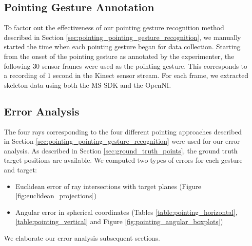 \subsection{Pointing Gesture Annotation}
\label{sec:pointing_gesture_annotation}

To factor out the effectiveness of our pointing gesture recognition method described in Section \ref{sec:pointing_pointing_gesture_recognition}, we manually started the time when each pointing gesture began for data collection. Starting from the onset of the pointing gesture as annotated by the experimenter, the following $30$ sensor frames were used as the pointing gesture. This corresponds to a recording of $1$ second in the Kinect sensor stream. For each frame, we extracted skeleton data using both the MS-SDK and the OpenNI.

\subsection{Error Analysis}
\label{sec:pointing_error_analysis}

The four rays corresponding to the four different pointing approaches described in Section \ref{sec:pointing_pointing_gesture_recognition} were used for our error analysis.  As described in Section \ref{sec:ground_truth_points}, the ground truth target positions are available. We computed two types of errors for each gesture and target:

\begin{itemize}
\item Euclidean error of ray intersections with target planes (Figure \ref{fig:euclidean_projections})
\item Angular error in spherical coordinates (Tables \ref{table:pointing_horizontal}, \ref{table:pointing_vertical} and Figure \ref{fig:pointing_angular_boxplots})
\end{itemize}

We elaborate our error analysis subsequent sections.

